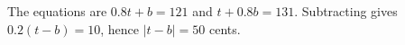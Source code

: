The equations are $0.8t+b=121$ and $t+0.8b=131$. Subtracting gives $0.2(t-b)=10$, hence $\boxed{|t-b|=50}$ cents.
